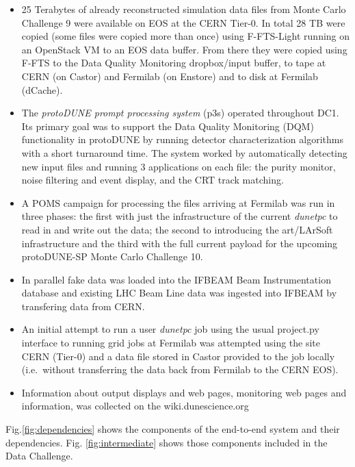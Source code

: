 \documentclass[pdftex,12pt,letter]{article}
\newcommand{\pd}{protoDUNE\xspace}
\newcommand{\dtpc}{\textit{dunetpc}\xspace}
\begin{document}
\begin{itemize}

\item 25 Terabytes of already reconstructed simulation data files from Monte Carlo Challenge 9 were available on EOS at the CERN Tier-0.
In total 28 TB  were copied (some files were copied more than once) using F-FTS-Light running on an OpenStack VM to an EOS data buffer.
From there they were copied using F-FTS to the Data Quality Monitoring dropbox/input buffer, to tape at CERN (on Castor) and Fermilab
(on Enstore) and to disk at Fermilab (dCache). 

\item   The \textit{protoDUNE prompt processing system} (p3s) operated throughout DC1. Its primary goal was to support
the Data Quality Monitoring (DQM)  functionality in \pd by running detector characterization algorithms with a short turnaround time.
The system worked by automatically detecting new input files and running 3 applications on each file: the purity monitor,
noise filtering and event display, and the CRT track matching. 

\item A POMS campaign for processing the files arriving at Fermilab was run in three phases: the first with just the infrastructure
of the current \dtpc to read in and write out the data; the second to introducing the art/LArSoft infrastructure and the third with the full current payload for the
upcoming protoDUNE-SP Monte Carlo Challenge 10. 

\item In parallel fake data was loaded into the IFBEAM Beam Instrumentation database and existing LHC Beam Line data was ingested into IFBEAM by transfering data from CERN.

\item An initial attempt to run a user \dtpc job using the  usual project.py interface to running grid jobs at Fermilab was
attempted using the site CERN (Tier-0) and a data file stored in Castor provided to the job locally (i.e.~without transferring
the data back from Fermilab to the CERN EOS). 

\item Information about output displays and web pages, monitoring web pages and information, was collected on the wiki.dunescience.org

\end{itemize}

 Fig.\ref{fig:dependencies} shows the components of the end-to-end system and their dependencies. Fig. \ref{fig:intermediate} shows those components included in the Data Challenge. 
\end{document}
